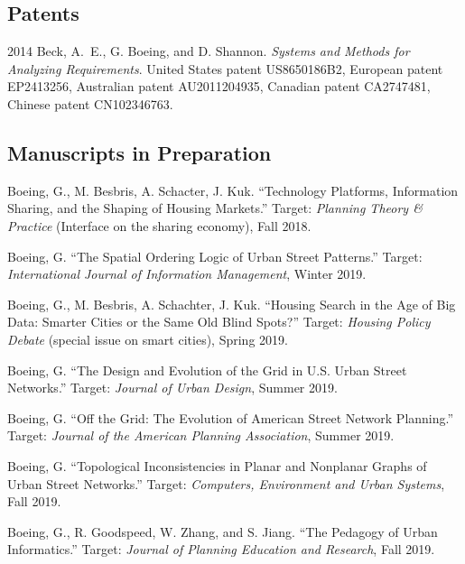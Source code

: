 \documentclass[12pt,letterpaper]{report}
\begin{document}
	
	
	\subsection*{Patents}
	
	\begin{tablist}
		
		\item[2014] \tab Beck, A.~E., G. Boeing, and D. Shannon. \textit{Systems and Methods for Analyzing Requirements}. United States patent US8650186B2, European patent EP2413256, Australian patent AU2011204935, Canadian patent CA2747481, Chinese patent CN102346763.
		
	\end{tablist}
	
	
	
	\subsection*{Manuscripts in Preparation}
	
	\begin{tablist}
			
		\item[\the\year] \tab Boeing, G., M. Besbris, A. Schacter, J. Kuk. \enquote{Technology Platforms, Information Sharing, and the Shaping of Housing Markets.} Target: \textit{Planning Theory \& Practice} (Interface on the sharing economy), Fall 2018.
		
		\item[\the\year] \tab Boeing, G. \enquote{The Spatial Ordering Logic of Urban Street Patterns.} Target: \textit{International Journal of Information Management}, Winter 2019.
		
		\item[\the\year] \tab Boeing, G., M. Besbris, A. Schachter, J. Kuk. \enquote{Housing Search in the Age of Big Data: Smarter Cities or the Same Old Blind Spots?} Target: \textit{Housing Policy Debate} (special issue on smart cities), Spring 2019.
		
		\item[\the\year] \tab Boeing, G. \enquote{The Design and Evolution of the Grid in U.S. Urban Street Networks.} Target: \textit{Journal of Urban Design}, Summer 2019.
		
		\item[\the\year] \tab Boeing, G. \enquote{Off the Grid: The Evolution of American Street Network Planning.} Target: \textit{Journal of the American Planning Association}, Summer 2019.
		
		\item[\the\year] \tab Boeing, G. \enquote{Topological Inconsistencies in Planar and Nonplanar Graphs of Urban Street Networks.} Target: \textit{Computers, Environment and Urban Systems}, Fall 2019.
		
		\item[\the\year] \tab Boeing, G., R. Goodspeed, W. Zhang, and S. Jiang. \enquote{The Pedagogy of Urban Informatics.} Target: \textit{Journal of Planning Education and Research}, Fall 2019.
		
	\end{tablist}
	
\end{document}
